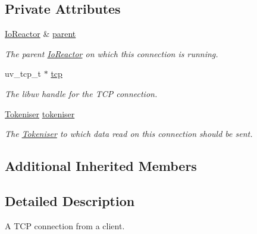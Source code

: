 \subsection*{Private Attributes}
\begin{DoxyCompactItemize}
\item 
\hypertarget{classTcpResponseSink_a190e607290f6ba6b3655c99e44a5e56e}{\hyperlink{classIoReactor}{Io\+Reactor} \& \hyperlink{classTcpResponseSink_a190e607290f6ba6b3655c99e44a5e56e}{parent}}\label{classTcpResponseSink_a190e607290f6ba6b3655c99e44a5e56e}

\begin{DoxyCompactList}\small\item\em The parent \hyperlink{classIoReactor}{Io\+Reactor} on which this connection is running. \end{DoxyCompactList}\item 
\hypertarget{classTcpResponseSink_afa43e15736053cef76fbf27bdc3197a9}{uv\+\_\+tcp\+\_\+t $\ast$ \hyperlink{classTcpResponseSink_afa43e15736053cef76fbf27bdc3197a9}{tcp}}\label{classTcpResponseSink_afa43e15736053cef76fbf27bdc3197a9}

\begin{DoxyCompactList}\small\item\em The libuv handle for the T\+C\+P connection. \end{DoxyCompactList}\item 
\hypertarget{classTcpResponseSink_ab289c592752e4c1fdc7d38cc9d6c2aab}{\hyperlink{classTokeniser}{Tokeniser} \hyperlink{classTcpResponseSink_ab289c592752e4c1fdc7d38cc9d6c2aab}{tokeniser}}\label{classTcpResponseSink_ab289c592752e4c1fdc7d38cc9d6c2aab}

\begin{DoxyCompactList}\small\item\em The \hyperlink{classTokeniser}{Tokeniser} to which data read on this connection should be sent. \end{DoxyCompactList}\end{DoxyCompactItemize}
\subsection*{Additional Inherited Members}


\subsection{Detailed Description}
A T\+C\+P connection from a client. 

